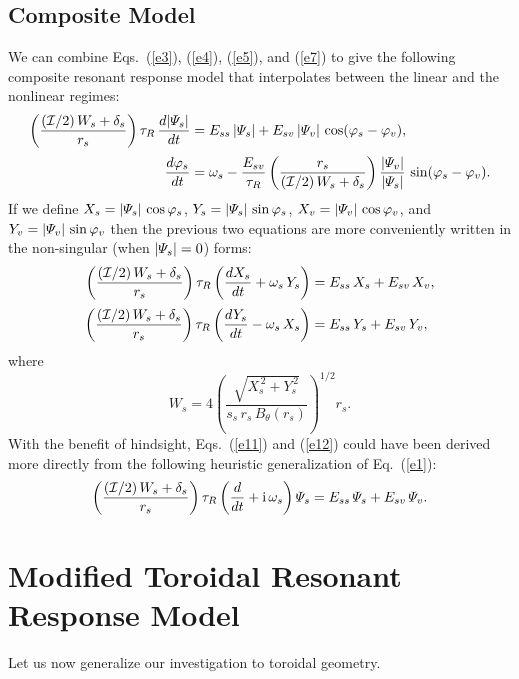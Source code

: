 \documentclass[12pt,prb,aps]{revtex4-1}
\begin{document}
\subsection{Composite Model}
We can combine Eqs.~(\ref{e3}), (\ref{e4}), (\ref{e5}), and (\ref{e7}) to give the following
composite resonant response model that interpolates between the linear and the nonlinear
regimes:
\begin{align}\label{e9}
\left(\frac{({\cal I}/2)\,W_s+\delta_s}{r_s}\right)\tau_R\,\frac{d|{\mit\Psi}_s|}{dt} &= E_{ss}\,|{\mit\Psi}_s| + E_{sv}\,|{\mit\Psi}_v|\,\cos(\varphi_s-\varphi_v),\\[0.5ex]
\frac{d\varphi_s}{dt}& = \omega_s - \frac{E_{sv}}{\tau_R}\left(\frac{r_s}{({\cal I}/2)\,W_s+\delta_s}\right)\frac{|{\mit\Psi}_v|}{|{\mit\Psi}_s|}\,\sin(\varphi_s-\varphi_v).\label{e10}
\end{align}
If we define $X_s = |{\mit\Psi}_s|\,\cos\varphi_s$, $Y_s = |{\mit\Psi}_s|\,\sin\varphi_s$, $X_v = |{\mit\Psi}_v|\,\cos\varphi_v$, and $Y_v = |{\mit\Psi}_v|\,\sin\varphi_v$ 
then the previous two equations are more conveniently written in the non-singular (when $|{\mit\Psi}_s|=0$) forms:\,\cite{slip1,slip2,slip3}
\begin{align}\label{e11}
\left(\frac{({\cal I}/2)\,W_s+\delta_s}{r_s}\right)\tau_R\left(\frac{dX_s}{dt}+\omega_s\,Y_s\right)&= E_{ss}\,X_s + E_{sv}\,X_v,\\[0.5ex]
\left(\frac{({\cal I}/2)\,W_s+\delta_s}{r_s}\right)\tau_R\left(\frac{dY_s}{dt}-\omega_s\,X_s\right)& = E_{ss}\,Y_s + E_{sv}\,Y_v,\label{e12}
\end{align}
where
\begin{equation}\label{e23x}
W_s = 4\left(\frac{\sqrt{X_s^{\,2}+Y_s^{\,2}}}{s_s\,r_s\,B_\theta(r_s)}\right)^{1/2} r_s.
\end{equation}
With the benefit of hindsight, Eqs.~(\ref{e11}) and (\ref{e12}) could have been derived more directly from the
following heuristic generalization of Eq.~(\ref{e1}):\,\cite{slip2}
\begin{equation}
\left(\frac{({\cal I}/2)\,W_s+\delta_s}{r_s}\right)\tau_R\left(\frac{d}{dt}+{\rm i}\,\omega_s\right){\mit\Psi}_s= E_{ss}\,{\mit\Psi}_s+E_{sv}\,{\mit\Psi}_v.
\end{equation}

\section{Modified Toroidal Resonant Response Model}\label{s3}
Let us now generalize our investigation to toroidal geometry. 
\end{document}
